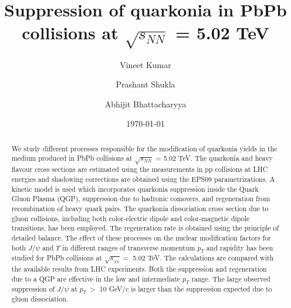\documentclass[12pt,a4paper,final]{iopart} %
\newcommand{\Jpsi}{J/\psi}
\newcommand{\pT}{p_{T}}
\newcommand{\sNN}{\sqrt{s_{_{NN}}}}
\begin{document}
\title[]{Suppression of quarkonia in PbPb collisions at $\sqrt{s_{NN}}$ =  5.02 TeV}
\author{Vineet Kumar}
\address{Nuclear Physics Division, Bhabha Atomic Research Center, Mumbai, India}
\author{Prashant Shukla}
\address{Nuclear Physics Division, Bhabha Atomic Research Center, Mumbai, India}
\address{Homi Bhabha National Institute, Anushakti Nagar, Mumbai, India}
\author{Abhijit Bhattacharyya}
\address{Department of Physics, University of Calcutta, 92, A. P. C. Road Kolkata-700009, India}


\date{\today}

\begin{abstract}
  
  We study different processes responsible for the modification of quarkonia yields
in the medium produced in PbPb collisions at $\sqrt{s_{NN}}$ =  5.02 TeV.
The quarkonia and heavy flavour cross sections are estimated using the measurements in
pp collisions at LHC energies and shadowing corrections are obtained using the EPS09
parametrizations. A kinetic model is used which incorporates quarkonia suppression
inside the Quark Gluon Plasma (QGP), suppression due to hadronic comovers, and regeneration
from recombination of heavy quark pairs. The quarkonia dissociation cross section due to gluon 
collisions, including both color-electric dipole and color-magnetic dipole transitions,
has been employed. The regeneration rate is obtained using the principle of 
detailed balance. The effect of these processes on the nuclear modification
factors for both $\Jpsi$ and $\Upsilon$ in different ranges of transverse momentum
$\pT$ and rapidity has been studied for PbPb collisions at $\sNN =$ 5.02 TeV. The calculations
are compared with the available results from LHC experiments. Both the suppression
and regeneration due to a QGP are effective in the low and intermediate $\pT$ range.
The large observed suppression of $\Jpsi$ at
$\pT~>$ 10 GeV/$c$ is larger than the suppression expected due to gluon dissociation.

\end{abstract}


\maketitle
\end{document}
